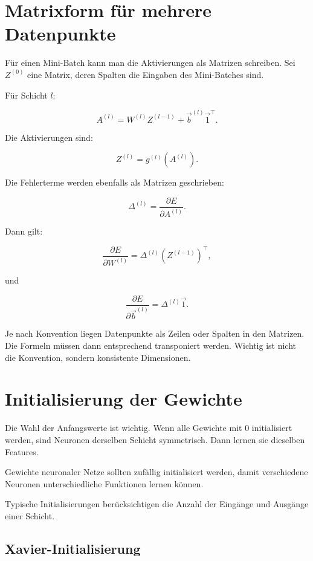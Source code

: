\section{Matrixform für mehrere Datenpunkte}

Für einen Mini-Batch kann man die Aktivierungen als Matrizen schreiben.
Sei \(Z^{(0)}\) eine Matrix, deren Spalten die Eingaben des Mini-Batches sind.

Für Schicht \(l\):

\[
    A^{(l)}
    =
    W^{(l)}Z^{(l-1)}
    +
    \vec{b}^{(l)}\vec{1}^{\top}.
\]

Die Aktivierungen sind:

\[
    Z^{(l)}
    =
    g^{(l)}(A^{(l)}).
\]

Die Fehlerterme werden ebenfalls als Matrizen geschrieben:

\[
    \Delta^{(l)}
    =
    \frac{\partial E}{\partial A^{(l)}}.
\]

Dann gilt:

\[
    \frac{\partial E}{\partial W^{(l)}}
    =
    \Delta^{(l)}
    (Z^{(l-1)})^{\top},
\]

und

\[
    \frac{\partial E}{\partial \vec{b}^{(l)}}
    =
    \Delta^{(l)}\vec{1}.
\]

\begin{notebox}
Je nach Konvention liegen Datenpunkte als Zeilen oder Spalten in den Matrizen.
Die Formeln müssen dann entsprechend transponiert werden.
Wichtig ist nicht die Konvention, sondern konsistente Dimensionen.
\end{notebox}

\section{Initialisierung der Gewichte}

Die Wahl der Anfangswerte ist wichtig.
Wenn alle Gewichte mit \(0\) initialisiert werden, sind Neuronen derselben Schicht symmetrisch.
Dann lernen sie dieselben Features.

\begin{conceptbox}
Gewichte neuronaler Netze sollten zufällig initialisiert werden, damit verschiedene Neuronen unterschiedliche Funktionen lernen können.
\end{conceptbox}

Typische Initialisierungen berücksichtigen die Anzahl der Eingänge und Ausgänge einer Schicht.

\subsection{Xavier-Initialisierung}

